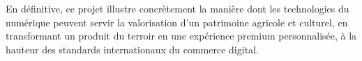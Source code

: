 En définitive, ce projet illustre concrètement la manière dont les technologies du numérique peuvent servir la valorisation d'un patrimoine agricole et culturel, en transformant un produit du terroir en une expérience premium personnalisée, à la hauteur des standards internationaux du commerce digital.
